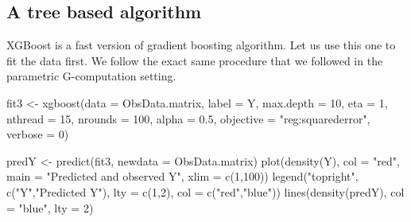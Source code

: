 \documentclass[
]{book}
\newenvironment{Shaded}{\begin{snugshade}}{\end{snugshade}}
\newcommand{\AttributeTok}[1]{\textcolor[rgb]{0.77,0.63,0.00}{#1}}
\newcommand{\DecValTok}[1]{\textcolor[rgb]{0.00,0.00,0.81}{#1}}
\newcommand{\FloatTok}[1]{\textcolor[rgb]{0.00,0.00,0.81}{#1}}
\newcommand{\FunctionTok}[1]{\textcolor[rgb]{0.00,0.00,0.00}{#1}}
\newcommand{\NormalTok}[1]{#1}
\newcommand{\OtherTok}[1]{\textcolor[rgb]{0.56,0.35,0.01}{#1}}
\newcommand{\SpecialCharTok}[1]{\textcolor[rgb]{0.00,0.00,0.00}{#1}}
\newcommand{\StringTok}[1]{\textcolor[rgb]{0.31,0.60,0.02}{#1}}
\begin{document}
\hypertarget{a-tree-based-algorithm}{%
\subsection{A tree based algorithm}\label{a-tree-based-algorithm}}

XGBoost is a fast version of gradient boosting algorithm. Let us use this one to fit the data first. We follow the exact same procedure that we followed in the parametric G-computation setting.

\begin{Shaded}
\end{Shaded}

\begin{Shaded}
\begin{Highlighting}[]
\NormalTok{fit3 }\OtherTok{\textless{}{-}} \FunctionTok{xgboost}\NormalTok{(}\AttributeTok{data =}\NormalTok{ ObsData.matrix, }
                \AttributeTok{label =}\NormalTok{ Y,}
                \AttributeTok{max.depth =} \DecValTok{10}\NormalTok{, }
                \AttributeTok{eta =} \DecValTok{1}\NormalTok{, }
                \AttributeTok{nthread =} \DecValTok{15}\NormalTok{, }
                \AttributeTok{nrounds =} \DecValTok{100}\NormalTok{, }
                \AttributeTok{alpha =} \FloatTok{0.5}\NormalTok{,}
                \AttributeTok{objective =} \StringTok{"reg:squarederror"}\NormalTok{, }
                \AttributeTok{verbose =} \DecValTok{0}\NormalTok{)}
\end{Highlighting}
\end{Shaded}

\begin{Shaded}
\begin{Highlighting}[]
\NormalTok{predY }\OtherTok{\textless{}{-}} \FunctionTok{predict}\NormalTok{(fit3, }\AttributeTok{newdata =}\NormalTok{ ObsData.matrix)}
\FunctionTok{plot}\NormalTok{(}\FunctionTok{density}\NormalTok{(Y), }
     \AttributeTok{col =} \StringTok{"red"}\NormalTok{, }
     \AttributeTok{main =} \StringTok{"Predicted and observed Y"}\NormalTok{,}
     \AttributeTok{xlim =} \FunctionTok{c}\NormalTok{(}\DecValTok{1}\NormalTok{,}\DecValTok{100}\NormalTok{))  }
\FunctionTok{legend}\NormalTok{(}\StringTok{"topright"}\NormalTok{, }
       \FunctionTok{c}\NormalTok{(}\StringTok{"Y"}\NormalTok{,}\StringTok{"Predicted Y"}\NormalTok{), }
       \AttributeTok{lty =} \FunctionTok{c}\NormalTok{(}\DecValTok{1}\NormalTok{,}\DecValTok{2}\NormalTok{), }
       \AttributeTok{col =} \FunctionTok{c}\NormalTok{(}\StringTok{"red"}\NormalTok{,}\StringTok{"blue"}\NormalTok{))}
\FunctionTok{lines}\NormalTok{(}\FunctionTok{density}\NormalTok{(predY), }\AttributeTok{col =} \StringTok{"blue"}\NormalTok{, }\AttributeTok{lty =} \DecValTok{2}\NormalTok{)}
\end{Highlighting}
\end{Shaded}
\end{document}
